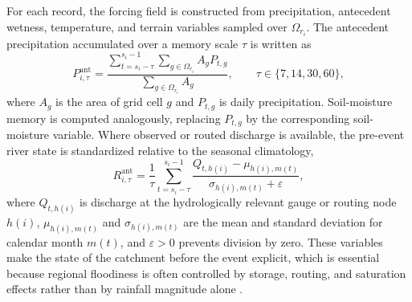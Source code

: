 \documentclass[pdflatex,sn-mathphys-ay]{sn-jnl}
\theoremstyle{thmstyleone}
\begin{document}
For each record, the forcing field is constructed from precipitation,
antecedent wetness, temperature, and terrain variables sampled over
$\Omega_{r_i}$.  The antecedent precipitation accumulated over a memory
scale $\tau$ is written as
\begin{equation}
  P^{\mathrm{ant}}_{i,\tau}
  =
  \frac{
  \displaystyle
  \sum_{t=s_i-\tau}^{s_i-1}
  \sum_{g\in\Omega_{r_i}} A_g P_{t,g}
  }{
  \displaystyle
  \sum_{g\in\Omega_{r_i}} A_g
  },
  \qquad
  \tau\in\{7,14,30,60\},
  \label{eq:antecedent_precip}
\end{equation}
where $A_g$ is the area of grid cell $g$ and $P_{t,g}$ is daily
precipitation.  Soil-moisture memory is computed analogously, replacing
$P_{t,g}$ by the corresponding soil-moisture variable.  Where observed
or routed discharge is available, the pre-event river state is
standardized relative to the seasonal climatology,
\begin{equation}
  R^{\mathrm{ant}}_{i,\tau}
  =
  \frac{1}{\tau}
  \sum_{t=s_i-\tau}^{s_i-1}
  \frac{
    Q_{t,h(i)}-\mu_{h(i),m(t)}
  }{
    \sigma_{h(i),m(t)}+\varepsilon
  },
  \label{eq:river_state}
\end{equation}
where $Q_{t,h(i)}$ is discharge at the hydrologically relevant gauge or
routing node $h(i)$, $\mu_{h(i),m(t)}$ and $\sigma_{h(i),m(t)}$ are the
mean and standard deviation for calendar month $m(t)$, and
$\varepsilon>0$ prevents division by zero.  These variables make the
state of the catchment before the event explicit, which is essential
because regional floodiness is often controlled by storage, routing,
and saturation effects rather than by rainfall magnitude alone
\citep{Seneviratne2010,Stephens2015}.
\end{document}
